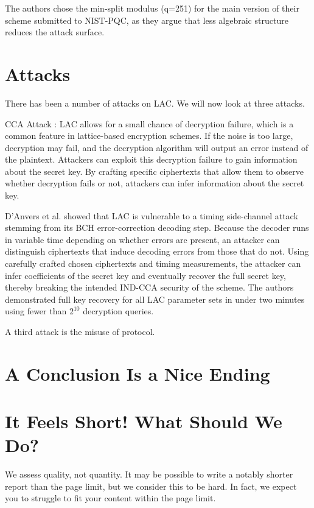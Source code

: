 \documentclass[11pt,twoside]{article}
\begin{document}
The authors chose the min-split modulus (q=251) for the main version of their scheme submitted to NIST-PQC, as they argue that less algebraic structure reduces the attack surface.

\section{Attacks}
There has been a number of attacks on LAC.
We will now look at three attacks.

CCA Attack \cite{10.1007/978-3-030-34578-5_4}: LAC allows for a small 
chance of decryption failure, 
which is a common feature in 
lattice-based encryption schemes.
If the noise is too large, decryption may fail,
and the decryption algorithm will output 
an error instead of the plaintext.
Attackers can exploit this decryption failure
to gain information about the secret key.
By crafting specific ciphertexts that
allow them to observe whether decryption fails or not,
attackers can infer information about the secret key.


D'Anvers et al. showed that LAC is vulnerable to a timing side-channel 
attack stemming from its BCH error-correction 
decoding step. Because the decoder runs
in variable time depending on whether errors 
are present, an attacker can distinguish 
ciphertexts that induce decoding errors
from those that do not. 
Using carefully crafted chosen
ciphertexts and timing measurements,
the attacker can infer coefficients
of the secret key and eventually recover 
the full secret key,
thereby breaking the intended
IND-CCA security of the scheme.
The authors demonstrated full key
recovery for all LAC parameter sets 
in under two minutes using fewer than 
$2^10$ decryption queries.

A third attack is the misuse of protocol.

\section{A Conclusion Is a Nice Ending}

\appendix

\section{It Feels Short! What Should We Do?}

We assess quality, not quantity. It may be possible to write a notably
shorter report than the page limit, but we consider this to be
hard. In fact, we expect you to struggle to fit your content within
the page limit.
\end{document}
